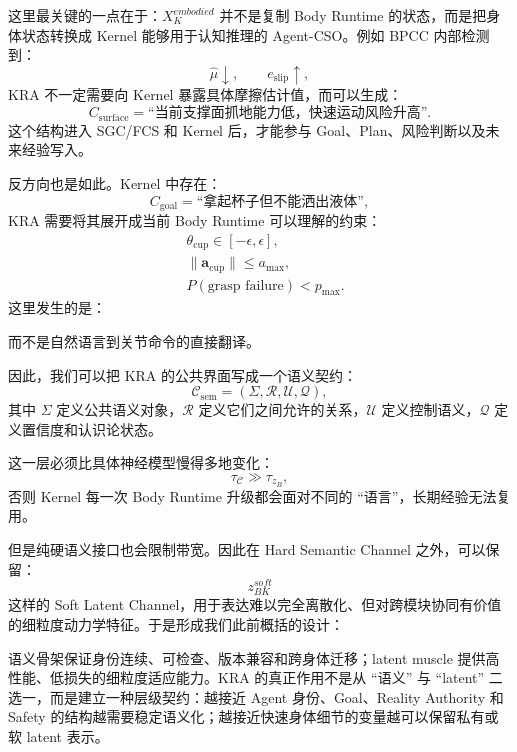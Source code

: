 这里最关键的一点在于：$X_K^{embodied}$ 并不是复制 Body Runtime 的状态，而是把身体状态转换成 Kernel 能够用于认知推理的 Agent-CSO。例如 BPCC 内部检测到：
\[
\hat \mu\downarrow,\qquad
e_{\text{slip}}\uparrow,
\]
KRA 不一定需要向 Kernel 暴露具体摩擦估计值，而可以生成：
\[
C_{\text{surface}}
=
\text{``当前支撑面抓地能力低，快速运动风险升高''}.
\]
这个结构进入 SGC/FCS 和 Kernel 后，才能参与 Goal、Plan、风险判断以及未来经验写入。

反方向也是如此。Kernel 中存在：
\[
C_{\text{goal}}
=
\text{``拿起杯子但不能洒出液体''},
\]
KRA 需要将其展开成当前 Body Runtime 可以理解的约束：
\[
\begin{aligned}
&\theta_{\text{cup}}\in[-\epsilon,\epsilon],\\
&\|\mathbf a_{\text{cup}}\|\le a_{\max},\\
&P(\text{grasp failure})<p_{\max}.
\end{aligned}
\]
这里发生的是：
\begin{statementbox}
\centering
{}
\end{statementbox}
而不是自然语言到关节命令的直接翻译。

因此，我们可以把 KRA 的公共界面写成一个语义契约：
\[
\mathcal C_{\text{sem}}
=
(
\Sigma,
\mathcal R,
\mathcal U,
\mathcal Q
),
\]
其中 $\Sigma$ 定义公共语义对象，$\mathcal R$ 定义它们之间允许的关系，$\mathcal U$ 定义控制语义，$\mathcal Q$ 定义置信度和认识论状态。

这一层必须比具体神经模型慢得多地变化：
\[
\tau_{\mathcal C}
\gg
\tau_{z_B},
\]
否则 Kernel 每一次 Body Runtime 升级都会面对不同的 ``语言''，长期经验无法复用。

但是纯硬语义接口也会限制带宽。因此在 Hard Semantic Channel 之外，可以保留：
\[
z^{soft}_{BK}
\]
这样的 Soft Latent Channel，用于表达难以完全离散化、但对跨模块协同有价值的细粒度动力学特征。于是形成我们此前概括的设计：

\begin{statementbox}
\centering
{}
\end{statementbox}

语义骨架保证身份连续、可检查、版本兼容和跨身体迁移；latent muscle 提供高性能、低损失的细粒度适应能力。KRA 的真正作用不是从 ``语义'' 与 ``latent'' 二选一，而是建立一种层级契约：越接近 Agent 身份、Goal、Reality Authority 和 Safety 的结构越需要稳定语义化；越接近快速身体细节的变量越可以保留私有或软 latent 表示。

